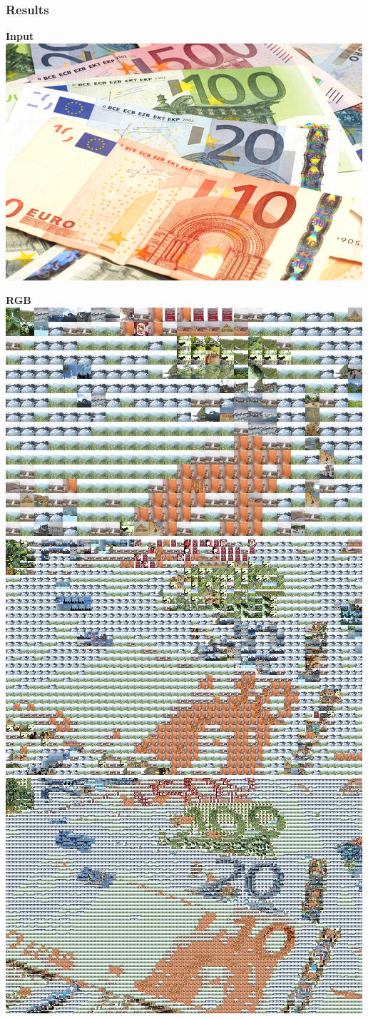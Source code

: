 \documentclass[11pt]{beamer}
\begin{document}
\begin{frame}
\frametitle{Results}
\textbf{Input}\\

\includegraphics[width=.3\textwidth]{euros.jpg}

\textbf{RGB}\\

\includegraphics[width=.35\textwidth]{euros-rgb-20.jpg}
%
\includegraphics[width=.35\textwidth]{euros-rgb-10.jpg}
%
\includegraphics[width=.35\textwidth]{euros-rgb-5.jpg}
\end{frame}
\end{document}
